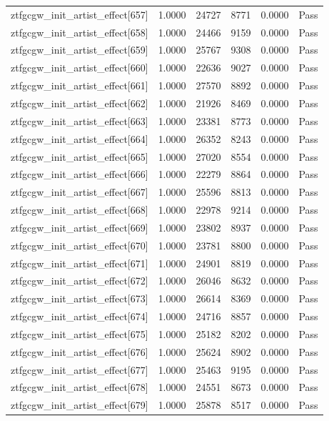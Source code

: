 \begin{table}[htbp]
\begin{tabular}{llrrll}
ztfgcgw\_init\_artist\_effect[657] & 1.0000 & 24727 & 8771 & 0.0000 & Pass \\
ztfgcgw\_init\_artist\_effect[658] & 1.0000 & 24466 & 9159 & 0.0000 & Pass \\
ztfgcgw\_init\_artist\_effect[659] & 1.0000 & 25767 & 9308 & 0.0000 & Pass \\
ztfgcgw\_init\_artist\_effect[660] & 1.0000 & 22636 & 9027 & 0.0000 & Pass \\
ztfgcgw\_init\_artist\_effect[661] & 1.0000 & 27570 & 8892 & 0.0000 & Pass \\
ztfgcgw\_init\_artist\_effect[662] & 1.0000 & 21926 & 8469 & 0.0000 & Pass \\
ztfgcgw\_init\_artist\_effect[663] & 1.0000 & 23381 & 8773 & 0.0000 & Pass \\
ztfgcgw\_init\_artist\_effect[664] & 1.0000 & 26352 & 8243 & 0.0000 & Pass \\
ztfgcgw\_init\_artist\_effect[665] & 1.0000 & 27020 & 8554 & 0.0000 & Pass \\
ztfgcgw\_init\_artist\_effect[666] & 1.0000 & 22279 & 8864 & 0.0000 & Pass \\
ztfgcgw\_init\_artist\_effect[667] & 1.0000 & 25596 & 8813 & 0.0000 & Pass \\
ztfgcgw\_init\_artist\_effect[668] & 1.0000 & 22978 & 9214 & 0.0000 & Pass \\
ztfgcgw\_init\_artist\_effect[669] & 1.0000 & 23802 & 8937 & 0.0000 & Pass \\
ztfgcgw\_init\_artist\_effect[670] & 1.0000 & 23781 & 8800 & 0.0000 & Pass \\
ztfgcgw\_init\_artist\_effect[671] & 1.0000 & 24901 & 8819 & 0.0000 & Pass \\
ztfgcgw\_init\_artist\_effect[672] & 1.0000 & 26046 & 8632 & 0.0000 & Pass \\
ztfgcgw\_init\_artist\_effect[673] & 1.0000 & 26614 & 8369 & 0.0000 & Pass \\
ztfgcgw\_init\_artist\_effect[674] & 1.0000 & 24716 & 8857 & 0.0000 & Pass \\
ztfgcgw\_init\_artist\_effect[675] & 1.0000 & 25182 & 8202 & 0.0000 & Pass \\
ztfgcgw\_init\_artist\_effect[676] & 1.0000 & 25624 & 8902 & 0.0000 & Pass \\
ztfgcgw\_init\_artist\_effect[677] & 1.0000 & 25463 & 9195 & 0.0000 & Pass \\
ztfgcgw\_init\_artist\_effect[678] & 1.0000 & 24551 & 8673 & 0.0000 & Pass \\
ztfgcgw\_init\_artist\_effect[679] & 1.0000 & 25878 & 8517 & 0.0000 & Pass \\

\end{tabular}
\end{table}
